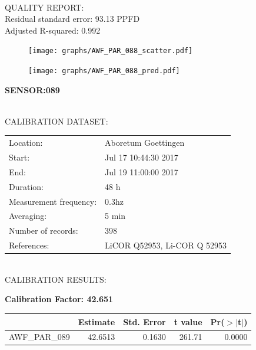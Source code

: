 \documentclass[oneside]{report}
\begin{document}
\hrulefill\\
QUALITY REPORT:\\
Residual standard error: 93.13 PPFD\\
Adjusted R-squared: 0.992



\begin{figure}[H]
  \centering
  \texttt{[image: graphs/AWF\_PAR\_088\_scatter.pdf]}
\end{figure}




\begin{figure}[H]
  \centering
  \texttt{[image: graphs/AWF\_PAR\_088\_pred.pdf]}
\end{figure}

\pagebreak


\begin{center}
\large{\textbf{SENSOR:089}}\\
\end{center}

\hrulefill\\
CALIBRATION DATASET:\\
\begin{table}[h!]
  \centering
  \label{tab:table1}
  \begin{tabular}{ll}
    Location: & Aboretum Goettingen\\ 
    
    
    Start:  & Jul 17 10:44:30 2017 \\
    End:   & Jul 19 11:00:00 2017\\ 
    Duration: & 48 h\\
    Measurement frequency: & 0.3hz\\
    Averaging:  &5 min\\
    Number of records: & 398 \\
    References: & LiCOR Q52953, Li-COR Q 52953 \\
  \end{tabular}
\end{table}

\hrulefill\\
CALIBRATION RESULTS:\\


\begin{center}
\textbf{\large{Calibration Factor: 42.651}}\\
\end{center}
\begin{table}[ht]
\centering
\begin{tabular}{rrrrr}
  \hline
 & Estimate & Std. Error & t value & Pr($>$$|$t$|$) \\ 
  \hline
AWF\_PAR\_089 & 42.6513 & 0.1630 & 261.71 & 0.0000 \\ 
   \hline
\end{tabular}
\end{table}
\end{document}

